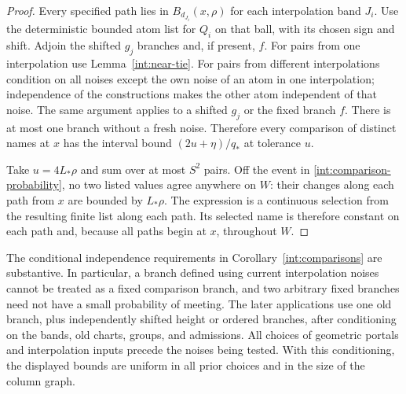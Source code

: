 \begin{proof}
Every specified path lies in $B_{d_{J_i}}(x,\rho)$ for each interpolation
band $J_i$. Use the deterministic bounded atom list for $Q_i$ on that
ball, with its chosen sign and shift. Adjoin the shifted $g_j$ branches
and, if present, $f$.
For pairs from one interpolation use Lemma~\ref{int:near-tie}.
For pairs from different interpolations condition on all noises
except the own noise of an atom in one interpolation; independence
of the constructions makes the other atom independent of that noise.
The same argument applies to a shifted $g_j$ or the fixed branch
$f$. There is at most one branch without a fresh noise. Therefore
every comparison of distinct names at $x$ has the interval bound
$(2u+\eta)/q_*$ at tolerance $u$.

Take $u=4L_*\rho$ and sum over at most $S^2$ pairs. Off the event
in \eqref{int:comparison-probability}, no two listed values agree
anywhere on $W$: their changes along each path from $x$ are bounded
by $L_*\rho$. The expression is a continuous selection from the
resulting finite list along each path. Its selected name is therefore
constant on each path and, because all paths begin at $x$, throughout
$W$.
\end{proof}

\begin{remark}\label{int:conditional-scope}
The conditional independence requirements in
Corollary~\ref{int:comparisons} are substantive.  In particular, a
branch defined using current interpolation noises cannot be treated
as a fixed comparison branch, and two arbitrary fixed branches need
not have a small probability of meeting.  The later applications use
one old branch, plus independently shifted height or ordered branches,
after conditioning on the bands, old charts, groups, and admissions.
All choices of geometric portals and interpolation inputs precede
the noises being tested.  With this conditioning, the displayed
bounds are uniform in all prior choices and in the size of the
column graph.
\end{remark}
